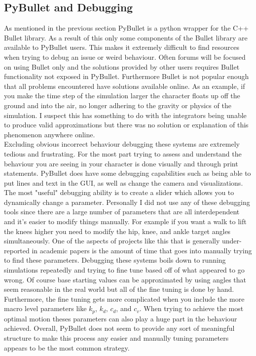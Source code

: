 \documentclass[12pt, a4paper]{article}
\begin{document}
\subsection{PyBullet and Debugging}
As mentioned in the previous section PyBullet is a python wrapper for the C++ Bullet library. As a result of this only some components of the Bullet library are available to PyBullet users. This makes it extremely difficult to find resources when trying to debug an issue or weird behaviour. Often forums will be focused on using Bullet only and the solutions provided by other users requires Bullet functionality not exposed in PyBullet. Furthermore Bullet is not popular enough that all problems encountered have solutions available online. As an example, if you make the time step of the simulation larger the character floats up off the ground and into the air, no longer adhering to the gravity or physics of the simulation. I suspect this has something to do with the integrators being unable to produce valid approximations but there was no solution or explanation of this phenomenon anywhere online. \\

Excluding obvious incorrect behaviour debugging these systems are extremely tedious and frustrating. For the most part trying to assess and understand the behaviour you are seeing in your character is done visually and through print statements. PyBullet does have some debugging capabilities such as being able to put lines and text in the GUI, as well as change the camera and visualizations. The most "useful" debugging ability is to create a slider which allows you to dynamically change a parameter. Personally I did not use any of these debugging tools since there are a large number of parameters that are all interdependent and it's easier to modify things manually. For example if you want a walk to lift the knees higher you need to modify the hip, knee, and ankle target angles simultaneously. One of the aspects of projects like this that is generally under-reported in academic papers is the amount of time that goes into manually trying to find these parameters. Debugging these systems boils down to running simulations repeatedly and trying to fine tune based off of what appeared to go wrong. Of course base starting values can be approximated by using angles that seem reasonable in the real world but all of the fine tuning is done by hand. Furthermore, the fine tuning gets more complicated when you include the more macro level parameters like $k_p$, $k_d$, $c_d$, and $c_v$. When trying to achieve the most optimal motion theses parameters can also play a huge part in the behaviour achieved. Overall, PyBullet does not seem to provide any sort of meaningful structure to make this process any easier and manually tuning parameters appears to be the most common strategy.\\
\end{document}
